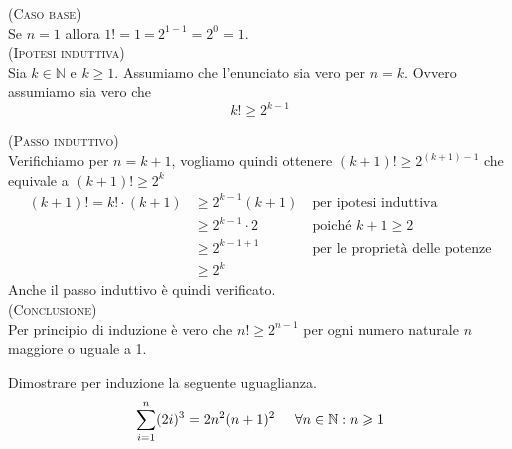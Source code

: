 \begin{soluzione}
\textsc{(Caso base)}\\
Se $n = 1$ allora $1! = 1 \ \textbf{=} \ 2^{1-1} = 2^0 = 1$.\\

\textsc{(Ipotesi induttiva)}\\
Sia $k \in \mathbb{N}$ e $k \geqslant 1$. Assumiamo che l'enunciato sia vero per $n = k$.  
Ovvero assumiamo sia vero che $$k! \geqslant 2^{k-1} $$

\textsc{(Passo induttivo)}\\
Verifichiamo per $n = k+1$, vogliamo quindi ottenere $(k+1)!\geq 2^{(k+1)-1}$ che equivale a $(k+1)!\geq 2^k$
\begin{align*}
(k+1)! = k!\cdot (k+1) &\geq 2^{k-1}(k+1)\ &\text{per ipotesi induttiva}\\
&\geq 2^{k-1}\cdot 2\ &\text{poiché } k+1\geq 2\\
&\geq 2^{k-1+1}\ &\text{per le proprietà delle potenze}\\
&\geq 2^k
\end{align*}
Anche il passo induttivo è quindi verificato.\\
			
\textsc{(Conclusione)}\\
Per principio di induzione è vero che $n! \geqslant 2^{n-1} $ per ogni numero naturale $n$ maggiore o uguale a 1. \\
\end{soluzione}


\begin{esercizio}
Dimostrare per induzione la seguente uguaglianza.
$$\sum\limits_{i=1}^{n} (2i)^3 = 2n^2(n+1)^2 \hspace{.5cm} \forall n\in \mathbb{N}: n\geqslant1$$
\end{esercizio}

